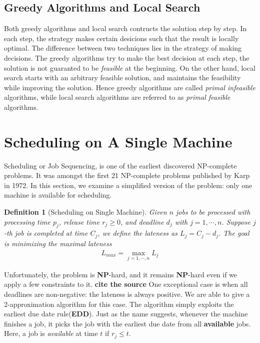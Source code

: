 \documentclass[11pt,psfig,times]{article}
\newcommand*{\NP}{\textbf{NP}}
\newtheorem{definition}[theorem]{Definition}
\begin{document}
\subsection{Greedy Algorithms and Local Search}
Both greedy algorithms and local search contructs the solution step by step. 
In each step, the strategy makes certain desicions such that the result is locally optimal. 
The difference between two techniques lies in the strategy of making decisions. 
The greedy algorithms try to make the best decision at each step, the solution is not guaranted to 
be \textit{feasible} at the beginning. On the other hand, local search starts with an arbitrary feasible solution,
and maintains the feasibility while improving the solution. 
Hence greedy algorithms are called \textit{primal infeasible} algorithms, while local search algorithms 
are referred to as \textit{primal feasible} algorithms.


\section{Scheduling on A Single Machine}
Scheduling or Job Sequencing, is one of the earliest discovered NP-complete problems. 
It was amongst the first 21 NP-complete problems published by Karp in 1972. In this section, 
we examine a simplified version of the problem: only one machine is available for scheduling.
\begin{definition}[Scheduling on Single Machine]
    Given $n$ jobs to be processed with processing time $p_j$, release time $r_j \geq 0$, and deadline $d_j$ with $j = 1, \cdots, n$.
    Suppose $j$-th job is completed at time $C_j$, we define the lateness as $L_j = C_j - d_j$. The goal is minimizing the maximal lateness 
    \begin{align*}
        L_{max} = \max_{j = 1, \cdots, n} L_j
    \end{align*}
\end{definition} 
Unfortunately, the problem is \NP-hard, and it remains \NP-hard even if we apply 
a few constraints to it. \textbf{cite the source} One exceptional case is when all deadlines are non-negative: the lateness is always positive. 
We are able to give a 2-approximation algorithm for this case. The algorithm simply exploits the earliest due date rule(\textbf{EDD}). 
Just as the name suggests, whenever the machine finishes a job, it picks the job with the earliest due date from all \textbf{available} jobs.
Here, a job is \textit{available} at time $t$ if $r_j \leq t$.
\end{document}
